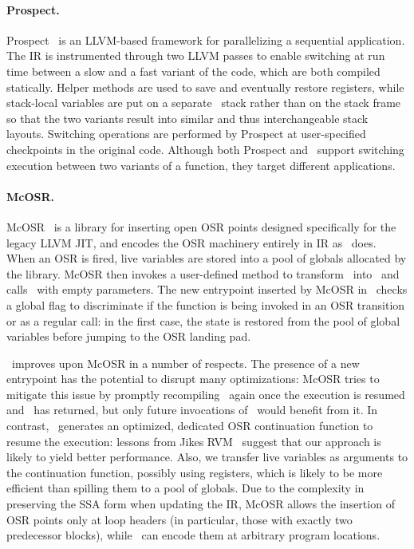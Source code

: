 \paragraph*{Prospect.} Prospect~\cite{Susskraut10} is an LLVM-based framework for parallelizing a sequential application. The IR is instrumented through two LLVM passes to enable switching at run time between a slow and a fast variant of the code, which are both compiled statically. Helper methods are used to save and eventually restore registers, while stack-local variables are put on a separate \alloca\ stack rather than on the stack frame so that the two variants result into similar and thus interchangeable stack layouts.
Switching operations are performed by Prospect at user-specified checkpoints in the original code. Although both Prospect and \osrkit\ support switching execution between two variants of a function, they target different applications.

\paragraph*{McOSR.} McOSR~\cite{Lameed13} is a library for inserting open OSR points designed specifically for the legacy LLVM JIT, and encodes the OSR machinery entirely in IR as \osrkit\ does. When an OSR is fired, live variables are stored into a pool of globals allocated by the library. McOSR then invokes a user-defined method to transform \fbase\ into \fvariant\ and calls \fbase\ with empty parameters. The new entrypoint inserted by McOSR in \fbase\ checks a global flag to discriminate if the function is being invoked in an OSR transition or as a regular call: in the first case, the state is restored from the pool of global variables before jumping to the OSR landing pad.

\osrkit\ improves upon McOSR in a number of respects. The presence of a new entrypoint has the potential to disrupt many optimizations: McOSR tries to mitigate this issue by promptly recompiling \fbase\ again once the execution is resumed and \fbase\ has returned, but only future invocations of \fbase\ would benefit from it. In contrast, \osrkit\ generates an optimized, dedicated OSR continuation function to resume the execution: lessons from Jikes RVM~\cite{Fink03} suggest that our approach is likely to yield better performance. Also, we transfer live variables as arguments to the continuation function, possibly using registers, which is likely to be more efficient than spilling them to a pool of globals.
Due to the complexity in preserving the SSA form when updating the IR, McOSR allows the insertion of OSR points only at loop headers (in particular, those with exactly two predecessor blocks), while \osrkit\ can encode them at arbitrary program locations.

